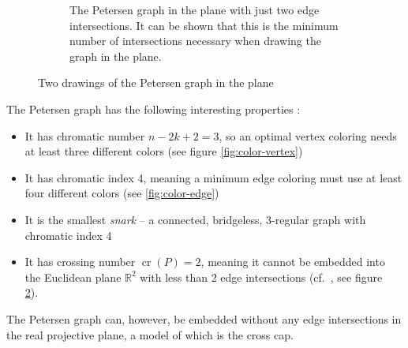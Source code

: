 \documentclass[11pt,            %
               a4paper,         %
               oneside,         %
               DIV12,           %
               fleqn,           %
               halfparskip,     %
               nochapterprefix, %
              ]{scrartcl} %
\theoremstyle{definition}
\begin{document}
\begin{figure}[p]
\begin{subfigure}[t]{.45\textwidth}
    \caption{The Petersen graph in the plane with just two edge
      intersections. It can be shown that this is the minimum number of
      intersections necessary when drawing the graph in the plane.}
    \label{fig:petersen-twointersect}
  \end{subfigure}
  \caption{Two drawings of the Petersen graph in the plane}
\end{figure}

The Petersen graph has the following interesting properties \cite{petersengraphbook,petersen}:

\begin{itemize}
  \item It has chromatic number $n - 2k + 2 = 3$, so an optimal vertex
    coloring needs at least three different colors (see figure
    \ref{fig:color-vertex})
  \item It has chromatic index 4, meaning a minimum edge coloring must
    use at least four different colors (see \ref{fig:color-edge})
  \item It is the smallest \emph{snark}\footnotemark[1]{} -- a
    connected, bridgeless\footnotemark[2]{}, 3-regular graph with chromatic index 4
  \item It has crossing number $\operatorname{cr}(P) = 2$,
    meaning it cannot be embedded into the Euclidean plane
    $\mathbb{R}^2$  with less than 2 edge intersections
    (cf.~\cite[p.~2]{crossingnr}, see figure~%
    \ref{fig:petersen-twointersect}).
\end{itemize}

The Petersen graph can, however, be embedded without any edge
intersections in the real projective plane, a model of which is the
cross cap.
\end{document}
